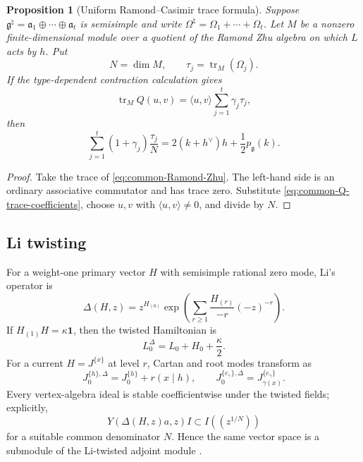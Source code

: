 \documentclass[11pt,reqno]{amsart}
\newtheorem{proposition}[theorem]{Proposition}
\theoremstyle{definition}
\theoremstyle{remark}
\begin{document}
\begin{proposition}[Uniform Ramond--Casimir trace formula]
\label{prop:common-Ramond-Casimir-trace}
Suppose
$\mathfrak g^\natural=\mathfrak a_1\oplus\cdots\oplus\mathfrak a_t$
is semisimple and write
$\Omega^\natural=\Omega_1+\cdots+\Omega_t$.  Let $M$ be a nonzero
finite-dimensional module over a quotient of the Ramond Zhu algebra on
which $L$ acts by $h$.  Put
\[
 N=\dim M,\qquad \tau_j=\operatorname{tr}_M(\Omega_j).
\]
If the type-dependent contraction calculation gives
\begin{equation}
 \operatorname{tr}_M Q(u,v)
 =\langle u,v\rangle\sum_{j=1}^t\gamma_j\tau_j,
 \label{eq:common-Q-trace-coefficients}
\end{equation}
then
\begin{equation*}
 \sum_{j=1}^t(1+\gamma_j)\frac{\tau_j}{N}
 =2(k+h^\vee)h+\frac12p_{\mathfrak g}(k).
\end{equation*}
\end{proposition}

\begin{proof}
Take the trace of \eqref{eq:common-Ramond-Zhu}.  The left-hand side is an
ordinary associative commutator and has trace zero.  Substitute
\eqref{eq:common-Q-trace-coefficients}, choose $u,v$ with
$\langle u,v\rangle\ne0$, and divide by $N$.
\end{proof}

\subsection{Li twisting}
\label{subsec:common-Li-twist}

For a weight-one primary vector $H$ with semisimple rational zero mode, Li's
operator is
\begin{equation*}
 \Delta(H,z)=z^{H_{(0)}}
 \exp\!\left(\sum_{r\ge1}\frac{H_{(r)}}{-r}(-z)^{-r}\right).
\end{equation*}
If $H_{(1)}H=\kappa\mathbf1$, then the twisted Hamiltonian is
\begin{equation}
  L_0^\Delta=L_0+H_0+\frac\kappa2.
  \label{eq:common-Li-Hamiltonian}
\end{equation}
For a current $H=J^{\{x\}}$ at level $r$, Cartan and root modes transform as
\begin{equation}
 J_0^{\{h\},\Delta}=J_0^{\{h\}}+r(x\mid h),
 \qquad
 J_0^{\{e_\gamma\},\Delta}=J_{\gamma(x)}^{\{e_\gamma\}}.
 \label{eq:common-Li-mode-shifts}
\end{equation}
Every vertex-algebra ideal is stable coefficientwise under the twisted
fields; explicitly,
\begin{equation}
 Y(\Delta(H,z)a,z)I\subset I((z^{1/N}))
 \label{eq:common-Li-ideal-stability}
\end{equation}
for a suitable common denominator $N$.  Hence the same vector space is a
submodule of the Li-twisted adjoint module \cite{Li2012}.
\end{document}
